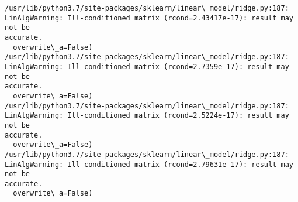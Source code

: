 \documentclass[11pt]{article}
\makeatletter
\newcommand{\boxspacing}{\kern\kvtcb@left@rule\kern\kvtcb@boxsep}
\newcommand{\prompt}[4]{
        \ttfamily\llap{{\color{#2}[#3]:\hspace{3pt}#4}}\vspace{-\baselineskip}
    }
\makeatother
\begin{document}
    \begin{Verbatim}[commandchars=\\\{\}]
/usr/lib/python3.7/site-packages/sklearn/linear\_model/ridge.py:187:
LinAlgWarning: Ill-conditioned matrix (rcond=2.43417e-17): result may not be
accurate.
  overwrite\_a=False)
/usr/lib/python3.7/site-packages/sklearn/linear\_model/ridge.py:187:
LinAlgWarning: Ill-conditioned matrix (rcond=2.7359e-17): result may not be
accurate.
  overwrite\_a=False)
/usr/lib/python3.7/site-packages/sklearn/linear\_model/ridge.py:187:
LinAlgWarning: Ill-conditioned matrix (rcond=2.5224e-17): result may not be
accurate.
  overwrite\_a=False)
/usr/lib/python3.7/site-packages/sklearn/linear\_model/ridge.py:187:
LinAlgWarning: Ill-conditioned matrix (rcond=2.79631e-17): result may not be
accurate.
  overwrite\_a=False)
    \end{Verbatim}

    \begin{tcolorbox}[breakable, size=fbox, boxrule=1pt, pad at break*=1mm,colback=cellbackground, colframe=cellborder]
\prompt{In}{incolor}{ }{\boxspacing}
\begin{Verbatim}[commandchars=\\\{\}]

\end{Verbatim}
\end{tcolorbox}


    
    
    
\end{document}
